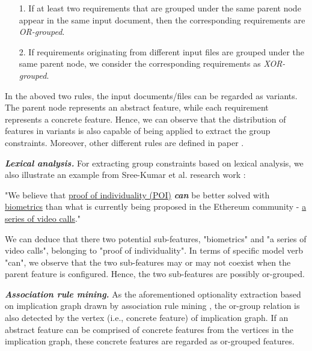 \documentclass[graybox]{svmult}
\begin{document}
\begin{shaded}
\begin{itemize}
    \item [1.] If at least two requirements that are grouped under the same parent node appear in the same input document, then the corresponding requirements are \textit{OR-grouped}.
    \item [2.] If requirements originating from different input files are grouped under the same parent node, we consider the corresponding requirements as \textit{XOR-grouped}.
\end{itemize} 
\end{shaded}
In the aboved two rules, the input documents/files can be regarded as variants. The parent node represents an abstract feature, while each requirement represents a concrete feature. Hence, we can observe that the distribution of features in variants is also capable of being applied to extract the group constraints. Moreover, other different rules are defined in paper \cite{LiSS18}.



\textit{\textbf{Lexical analysis.}} For extracting group constraints based on lexical analysis, we also illustrate an example from Sree-Kumar et al. research work \cite{Sree-KumarPC18}:
\begin{shaded}
"We believe that \underline{proof of individuality (POI)} \textit{\textbf{can}} be better solved with \underline{biometrics} than what is currently being proposed in the Ethereum community - \underline{a series of video calls}."
\end{shaded}
We can deduce that there two potential sub-features, "biometrics" and "a series of video calls", belonging to "proof of individuality". In terms of specific model verb "can", we observe that the two sub-features may or may not coexist when the parent feature is configured. Hence, the two sub-features are possibly or-grouped.


\textit{\textbf{Association rule mining.}} As the aforementioned optionality extraction based on implication graph drawn by association rule mining \cite{DavrilDHACH13}, the or-group relation is also detected by the vertex (i.e., concrete feature) of implication graph. If an abstract feature can be comprised of concrete features from the vertices in the implication graph, these concrete features are regarded as or-grouped features.
\end{document}

